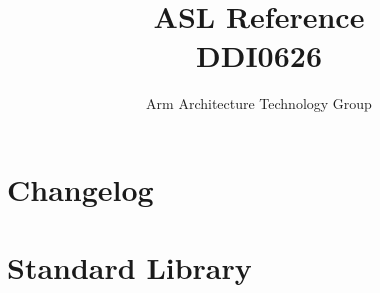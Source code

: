\documentclass{book}
\author{Arm Architecture Technology Group}
\title{ASL Reference \\
       DDI0626}
\begin{document}
\maketitle

\tableofcontents{}




\chapter{Changelog}





































\chapter{Standard Library}




\appendix

\end{document}
